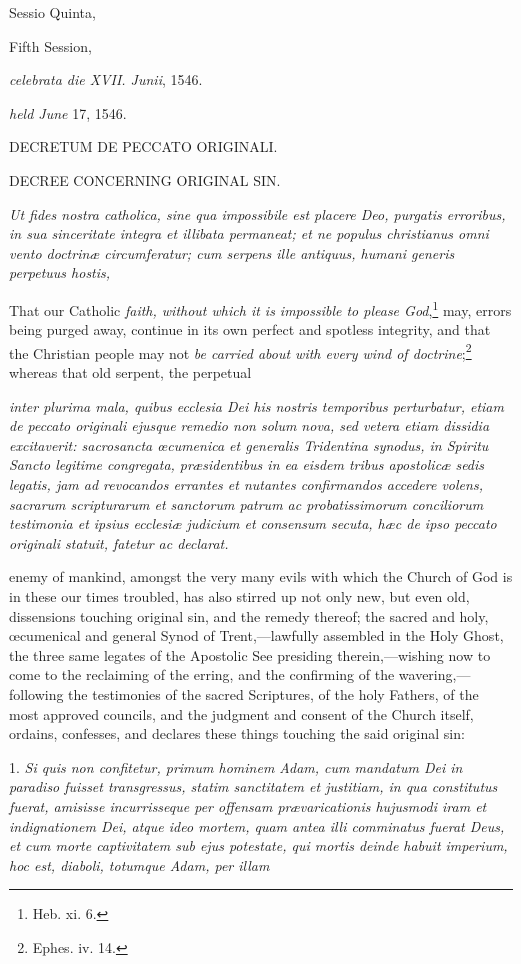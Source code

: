 Sessio Quinta,

Fifth Session,

\emph{celebrata die XVII. Junii}, 1546.

\emph{held June} 17, 1546.

DECRETUM DE PECCATO ORIGINALI.

DECREE CONCERNING ORIGINAL SIN.

\emph{Ut fides nostra catholica, sine qua impossibile est placere Deo, purgatis erroribus, in sua sinceritate integra et illibata permaneat; et ne populus christianus omni vento doctrinæ circumferatur; cum serpens ille antiquus, humani generis perpetuus hostis,}

That our Catholic \emph{faith, without which it is impossible to please God},\footnote{\par   Heb. xi. 6.} may, errors being purged away, continue in its own perfect and spotless integrity, and that the Christian people may not \emph{be carried about with every wind of doctrine};\footnote{\par   Ephes. iv. 14.} whereas that old serpent, the perpetual

\emph{inter plurima mala, quibus ecclesia Dei his nostris temporibus perturbatur, etiam de peccato originali ejusque remedio non solum nova, sed vetera etiam dissidia excitaverit: sacrosancta œcumenica et generalis Tridentina synodus, in Spiritu Sancto legitime congregata, præsidentibus in ea eisdem tribus apostolicæ sedis legatis, jam ad revocandos errantes et nutantes confirmandos accedere volens, sacrarum scripturarum et sanctorum patrum ac probatissimorum conciliorum testimonia et ipsius ecclesiæ judicium et consensum secuta, hæc de ipso peccato originali statuit, fatetur ac declarat.}

enemy of mankind, amongst the very many evils with which the Church of God is in these our times troubled, has also stirred up not only new, but even old, dissensions touching original sin, and the remedy thereof; the sacred and holy, œcumenical and general Synod of Trent,—lawfully assembled in the Holy Ghost, the three same legates of the Apostolic See presiding therein,—wishing now to come to the reclaiming of the erring, and the confirming of the wavering,—following the testimonies of the sacred Scriptures, of the holy Fathers, of the most approved councils, and the judgment and consent of the Church itself, ordains, confesses, and declares these things touching the said original sin:

1. \emph{Si quis non confitetur, primum hominem Adam, cum mandatum Dei in paradiso fuisset transgressus, statim sanctitatem et justitiam, in qua constitutus fuerat, amisisse incurrisseque per offensam prævaricationis hujusmodi iram et indignationem Dei, atque ideo mortem, quam antea illi comminatus fuerat Deus, et cum morte captivitatem sub ejus potestate, qui mortis deinde habuit imperium, hoc est, diaboli, totumque Adam, per illam}

